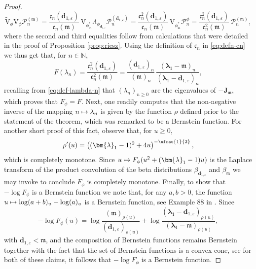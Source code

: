 \documentclass[JEP,XML,SOM,Unicode]{cedram}
\let\epsilon\varepsilon
\newcommand\mto{\mathchoice{\longmapsto}{\mapsto}{\mapsto}{\mapsto}}
\theoremstyle{plain}
\theoremstyle{definition}
\newcommand{\N}{\mathbb{N}}
\renewcommand{\P}{\mathcal{P}}
\newcommand{\calJd}{\mathbf{J}}
\newcommand{\m}{\mathfrak{m}}
\newcommand{\dz}{{\bm{d}}_{1,\epsilon}}
\newcommand{\lam}{{\bm{\lambda}_1}}
\newcommand{\phm}{{\phi_\m^*}}
\newcommand{\gab}[1][\lam,\mo]{{\beta_{#1}}}
\let\mo\mu
\begin{document}
\begin{proof}
\begin{equation*}
\widetilde{\mathrm{V}}_{\phi}\overline{\mathrm{V}}_{\phi} \P_n^{(\m)} = \frac{\mathfrak{c}_n(\dz)}{\mathfrak{c}_n(\m)}\, \mathrm{V}_{\phm} \Lambda_{\phi_{\dz}} \P_n^{(\dz)} = \frac{\mathfrak{c}_n^2(\dz)}{\mathfrak{c}_n(\m)}\, \mathrm{V}_{\phm} \P_n^\phi = \frac{\mathfrak{c}_n^2(\dz)}{\mathfrak{c}_n^2(\m)}\, \P_n^{(\m)},
\end{equation*}
where the second and third equalities follow from calculations that were detailed in the proof of Proposition \ref{prop:riesz}. Using the definition of $\mathfrak{c}_n$ in \eqref{eq:defn-cn} we thus get that, for $n \in \N$,
\begin{equation*}
F(\lambda_n) = \frac{\mathfrak{c}_n^2(\dz)}{\mathfrak{c}_n^2(\m)} = \frac{(\dz)_n}{(\m)_n}\, \frac{(\lam-\m)_n}{(\lam-\dz)_n},
\end{equation*}
recalling from \eqref{eq:def-lambda-n} that $(\lambda_n)_{n \geq 0}$ are the eigenvalues of $-\calJd_{\m}$, which proves that $F_\phi = F$. Next, one readily computes that the non-negative inverse of the mapping $n \mto \lambda_n$ is given by the function $\rho$ defined prior to the statement of the theorem, which was remarked to be a Bernstein function. For another short proof of this fact, observe that, for $u \geq 0$,
\begin{equation*}
\rho'(u) = \left((\lam-1)^2+4u\right)^{-\sfrac{1}{2}},
\end{equation*}
which is completely monotone. Since $u \mto F_\phi(u^2+(\lam-1)u)$ is the Laplace transform of the product convolution of the beta distributions $\gab[\dz]$ and $\gab[\m]$ we may invoke \cite[Th.\,3.7]{SchillingSongVondracek10} to conclude $F_\phi$ is completely monotone. Finally, to show that $-\log F_\phi$ is a Bernstein function we note that, for any $a, b > 0$, the function $u \mto \log (a+b)_u - \log (a)_u$ is a Bernstein function, see \eg Example 88 in \cite[Chap.\,16]{SchillingSongVondracek10}. Since
\begin{equation*}
-\log F_\phi(u) = \log \frac{(\m)_{\rho(u)}}{(\dz)_{\rho(u)}} + \log \frac{(\lam-\dz)_{\rho(u)}}{(\lam-\m)_{\rho(u)}},
\end{equation*}
with $\dz < \m$, and the composition of Bernstein functions remains Bernstein together with the fact that the set of Bernstein functions is a convex cone, see \eg \cite[Cor.\,3.8]{SchillingSongVondracek10} for both of these claims, it follows that $-\log F_\phi$ is a Bernstein function.
\end{proof}
\end{document}
